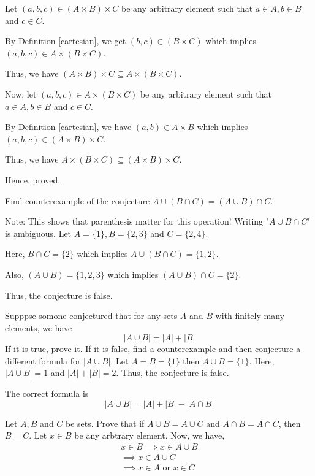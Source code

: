 \begin{enumerate}
	      Let $(a, b, c) \in (A \times B) \times C$ be any arbitrary element such that $a \in A, b \in B$ and $c \in C$.

	      By Definition \ref{cartesian}, we get $(b, c) \in (B \times C)$ which implies $(a, b, c) \in A \times (B \times C)$.

	      Thus, we have $(A \times B) \times C \subseteq A \times (B \times C)$.


	      Now, let $(a, b, c) \in A \times (B \times C)$ be any arbitrary element such that $a \in A, b \in B$ and $c \in C$.

	      By Definition \ref{cartesian}, we have $(a, b) \in A \times B$ which implies $(a, b, c) \in (A \times B) \times C$.

	      Thus, we have $A \times (B \times C) \subseteq (A \times B) \times C$.

	      Hence, proved.
	      \es
\end{enumerate}
\ep


\bp
Find counterexample of the conjecture $A \cup (B \cap C) = (A \cup B) \cap C$.

Note: This shows that parenthesis matter for this operation! Writing "$A \cup B \cap C$" is ambiguous.
\ep
\bs
Let $A = \{1\}, B = \{2,3\}$ and $C = \{2,4\}$.

Here, $B \cap C = \{2\}$ which implies $A \cup (B \cap C) = \{1,2\}$.

Also, $(A \cup B) = \{1,2,3\}$ which implies $(A \cup B) \cap C = \{2\}$.

Thus, the conjecture is false.
\es


\bp
Supppse somone conjectured that for any sets $A$ and $B$ with finitely many elements, we have $$|A \cup B| = |A| + |B|$$
If it is true, prove it. If it is false, find a counterexample and then conjecture a different formula for $|A \cup B|$.
\ep
\bs
Let $A = B = \{1\}$ then $A \cup B = \{1\}$.
Here, $|A \cup B| = 1$ and $|A| + |B| = 2$.
Thus, the conjecture is false.

The correct formula is $$|A \cup B| = |A| + |B| - |A \cap B|$$
\es

\bp
Let $A, B$ and $C$ be sets. Prove that if $A \cup B = A \cup C$ and $A \cap B = A \cap C$, then $B = C$.
\ep
\bs
Let $x \in B$ be any arbtrary element. Now, we have,
\begin{align*}
	x \in B \implies x \in A \cup B \\
	\implies x \in A \cup C         \\
	\implies x \in A \text{ or } x \in C
\end{align*}

